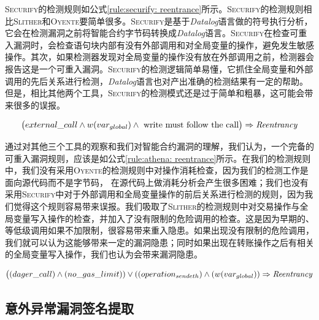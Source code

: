 \textsc{Securify}的检测规则如公式\ref{rule:securify: reentrance}所示。\textsc{Securify}的检测规则相比\textsc{Slither}和\textsc{Oyente}要简单很多。\textsc{Securify}是基于\emph{Datalog}语言做的符号执行分析，它会在检测漏洞之前将智能合约字节码转换成\emph{Datalog}语言。\textsc{Securify}在检查可重入漏洞时，会检查语句块内部有没有外部调用和对全局变量的操作，避免发生敏感操作。其次，如果检测器发现对全局变量的操作没有放在外部调用之前，检测器会报告这是一个可重入漏洞。\textsc{Securify}的检测逻辑简单易懂，它抓住全局变量和外部调用的先后关系进行检测，\emph{Datalog}语言也对产出准确的检测结果有一定的帮助。但是，相比其他两个工具，\textsc{Securify}的检测模式还是过于简单和粗暴，这可能会带来很多的误报。
\begin{mdframed}[
	linewidth = 1pt,
	innertopmargin = -10pt,
	innerbottommargin = 3pt,
	outerlinewidth = 1pt
	]
    \small
	\begin{equation} \label{rule:securify: reentrance}
    \big ( external\_call \wedge w(var_{global}) \wedge \text{ write must follow the call} \big ) \Rightarrow \text{\emph{Reentrancy}}
	\end{equation}
\end{mdframed}
通过对其他三个工具的观察和我们对智能合约漏洞的理解，我们认为，一个完备的可重入漏洞规则，应该是如公式\ref{rule:athena: reentrance}所示。在我们的检测规则中，我们没有采用\textsc{Oyente}的检测规则中对操作消耗检查，因为我们的检测工作是面向源代码而不是字节码， 在源代码上做消耗分析会产生很多困难；我们也没有采用\textsc{Securify}中对于外部调用和全局变量操作的前后关系进行检测的规则，因为我们觉得这个规则容易带来误报。我们吸取了\textsc{Slither}的检测规则中对交易操作与全局变量写入操作的检查，并加入了没有限制的危险调用的检查。这是因为早期的、等低级调用如果不加限制，很容易带来重入隐患。如果出现没有限制的危险调用，我们就可以认为这能够带来一定的漏洞隐患；同时如果出现在转账操作之后有相关的全局变量写入操作，我们也认为会带来漏洞隐患。
\begin{mdframed}[
	linewidth = 1pt,
	innertopmargin = -10pt,
	innerbottommargin = 3pt,
	outerlinewidth = 1pt
	]
    \small
	\begin{equation} \label{rule:athena: reentrance}
    \big ((dager\_call) \wedge (no\_gas\_limit)) \vee ((operation_{sendeth}) \wedge (w(var_{global})) \Rightarrow \text{\emph{Reentrancy}}
	\end{equation}
\end{mdframed}

\subsection{意外异常漏洞签名提取}

